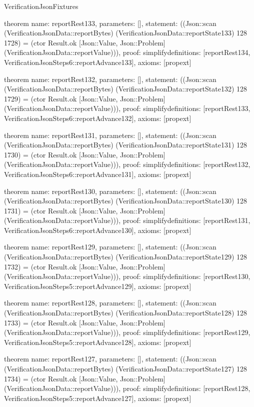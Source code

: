 \begin{lexlean}{VerificationJsonFixtures}
\begin{semanticmodule}
theorem{
  name: reportRest133,
  parameters: [],
  statement: ((Json::scan (VerificationJsonData::reportBytes) (VerificationJsonData::reportState133) 128 1728) = (ctor Result.ok [Json::Value, Json::Problem] (VerificationJsonData::reportValue))),
  proof: simplify{definitions: [reportRest134, VerificationJsonSteps6::reportAdvance133]},
  axioms: [propext]
}

theorem{
  name: reportRest132,
  parameters: [],
  statement: ((Json::scan (VerificationJsonData::reportBytes) (VerificationJsonData::reportState132) 128 1729) = (ctor Result.ok [Json::Value, Json::Problem] (VerificationJsonData::reportValue))),
  proof: simplify{definitions: [reportRest133, VerificationJsonSteps6::reportAdvance132]},
  axioms: [propext]
}

theorem{
  name: reportRest131,
  parameters: [],
  statement: ((Json::scan (VerificationJsonData::reportBytes) (VerificationJsonData::reportState131) 128 1730) = (ctor Result.ok [Json::Value, Json::Problem] (VerificationJsonData::reportValue))),
  proof: simplify{definitions: [reportRest132, VerificationJsonSteps6::reportAdvance131]},
  axioms: [propext]
}

theorem{
  name: reportRest130,
  parameters: [],
  statement: ((Json::scan (VerificationJsonData::reportBytes) (VerificationJsonData::reportState130) 128 1731) = (ctor Result.ok [Json::Value, Json::Problem] (VerificationJsonData::reportValue))),
  proof: simplify{definitions: [reportRest131, VerificationJsonSteps6::reportAdvance130]},
  axioms: [propext]
}

theorem{
  name: reportRest129,
  parameters: [],
  statement: ((Json::scan (VerificationJsonData::reportBytes) (VerificationJsonData::reportState129) 128 1732) = (ctor Result.ok [Json::Value, Json::Problem] (VerificationJsonData::reportValue))),
  proof: simplify{definitions: [reportRest130, VerificationJsonSteps5::reportAdvance129]},
  axioms: [propext]
}

theorem{
  name: reportRest128,
  parameters: [],
  statement: ((Json::scan (VerificationJsonData::reportBytes) (VerificationJsonData::reportState128) 128 1733) = (ctor Result.ok [Json::Value, Json::Problem] (VerificationJsonData::reportValue))),
  proof: simplify{definitions: [reportRest129, VerificationJsonSteps5::reportAdvance128]},
  axioms: [propext]
}

theorem{
  name: reportRest127,
  parameters: [],
  statement: ((Json::scan (VerificationJsonData::reportBytes) (VerificationJsonData::reportState127) 128 1734) = (ctor Result.ok [Json::Value, Json::Problem] (VerificationJsonData::reportValue))),
  proof: simplify{definitions: [reportRest128, VerificationJsonSteps5::reportAdvance127]},
  axioms: [propext]
}


\end{semanticmodule}
\end{lexlean}
